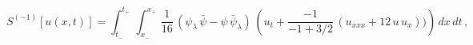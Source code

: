 \begin{equation*}
S^{(-1)}[u(x,t)] = \int_{t_-}^{t_+} \, \int_{x_-}^{x_+}
\,\frac{1}{16}\,\left( \psi_\lambda \,\bar{\psi}-\psi\,\bar{\psi}_\lambda
\right)\,\left(u_t + \frac{-1}{-1 + 3/2}\,
(u_{xxx}+12\,u\,u_x))\right)\,dx\,dt\,,
\end{equation*}

